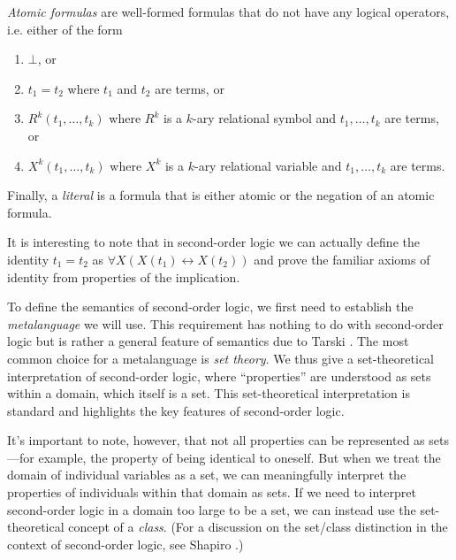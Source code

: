 \documentclass[11pt,twoside=off,numbers=noenddot]{scrbook}
\begin{document}
\emph{Atomic formulas} are well-formed formulas that do not have any logical operators, i.e. either of the form
\begin{enumerate}
  \item $\bot$, or
  \item $t_1 = t_2$ where $t_1$ and $t_2$ are terms, or
  \item $R^k(t_1, \dots, t_k)$ where $R^k$ is a $k$-ary relational symbol and $t_1, \dots, t_k$ are terms, or
  \item $X^k(t_1, \dots, t_k)$ where $X^k$ is a $k$-ary relational variable and $t_1, \dots, t_k$ are terms.
\end{enumerate}

Finally, a \emph{literal} is a formula that is either atomic or the negation of an atomic formula.

\begin{remark}
  It is interesting to note that in second-order logic we can actually define the identity $t_1 = t_2$ as $\forall X (X(t_1) \leftrightarrow X(t_2))$ and prove the familiar axioms of identity from properties of the implication.
\end{remark}

To define the semantics of second-order logic, we first need to establish the \emph{metalanguage} we will use. This requirement has nothing to do with second-order logic but is rather a general feature of semantics due to Tarski \cite{tarski1956concept}. The most common choice for a metalanguage is \emph{set theory}. We thus give a set-theoretical interpretation of second-order logic, where ``properties'' are understood as sets within a domain, which itself is a set. This set-theoretical interpretation is standard and highlights the key features of second-order logic.

\begin{remark}
  It's important to note, however, that not all properties can be represented as sets—for example, the property of being identical to oneself. But when we treat the domain of individual variables as a set, we can meaningfully interpret the properties of individuals within that domain as sets. If we need to interpret second-order logic in a domain too large to be a set, we can instead use the set-theoretical concept of a \emph{class}. (For a discussion on the set/class distinction in the context of second-order logic, see Shapiro \cite{shapiro1991foundations}.)
\end{remark}
\end{document}
